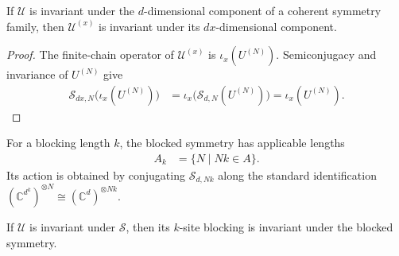 \begin{lemma}
    \label{thm:mpu_symmetry_identity_ancilla_invariant}
    \leanok
    If $\mathcal U$ is invariant under the $d$-dimensional component of a
    coherent symmetry family, then $\mathcal U^{(x)}$ is invariant under its
    $dx$-dimensional component.
\end{lemma}

\begin{proof}\leanok
    The finite-chain operator of $\mathcal U^{(x)}$ is $\iota_x(U^{(N)})$.
    Semiconjugacy and invariance of $U^{(N)}$ give
    \begin{align}
        \mathcal S_{dx,N}\bigl(\iota_x(U^{(N)})\bigr)
         & = \iota_x\bigl(\mathcal S_{d,N}(U^{(N)})\bigr)
        = \iota_x(U^{(N)}).
    \end{align}
\end{proof}

\begin{definition}
    \label{def:mpu_blocked_finite_chain_symmetry}
    \leanok
    For a blocking length $k$, the blocked symmetry has applicable lengths
    \begin{align}
        A_k & = \{N\mid Nk\in A\}.
    \end{align}
    Its action is obtained by conjugating $\mathcal S_{d,Nk}$ along the
    standard identification
    $(\mathbb C^{d^k})^{\otimes N}\cong(\mathbb C^d)^{\otimes Nk}$.
\end{definition}

\begin{lemma}
    \label{thm:mpu_symmetry_blocking_invariant}
    \leanok
    If $\mathcal U$ is invariant under $\mathcal S$, then its $k$-site blocking
    is invariant under the blocked symmetry.
\end{lemma}

